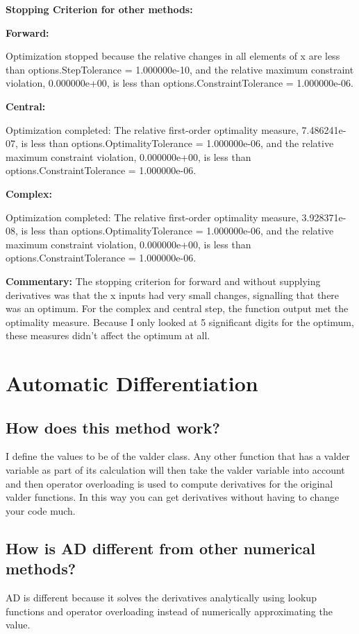 \documentclass[a4paper]{article}
\begin{document}
\textbf{Stopping Criterion for other methods:}

\textbf{Forward:}

Optimization stopped because the relative changes in all elements of x are
less than options.StepTolerance = 1.000000e-10, and the relative maximum constraint
violation, 0.000000e+00, is less than options.ConstraintTolerance = 1.000000e-06.

\textbf{Central:}

Optimization completed: The relative first-order optimality measure, 7.486241e-07,
is less than options.OptimalityTolerance = 1.000000e-06, and the relative maximum constraint
violation, 0.000000e+00, is less than options.ConstraintTolerance = 1.000000e-06.

\textbf{Complex:}

Optimization completed: The relative first-order optimality measure, 3.928371e-08,
is less than options.OptimalityTolerance = 1.000000e-06, and the relative maximum constraint
violation, 0.000000e+00, is less than options.ConstraintTolerance = 1.000000e-06.

\textbf{Commentary:}
The stopping criterion for forward and without supplying derivatives was that the x inputs had very small changes, signalling that there was an optimum. 
For the complex and central step, the function output met the optimality measure. 
Because I only looked at 5 significant digits for the optimum, these measures didn't affect the optimum at all.

\section{Automatic Differentiation}
\subsection{How does this method work?}
I define the values to be of the valder class. 
Any other function that has a valder variable as part of its calculation will then take the valder variable  into account and then operator overloading is used to compute derivatives for the original valder functions.
In this way you can get derivatives without having to change your code much.
\subsection{How is AD different from other numerical methods?}
AD is different because it solves the derivatives analytically using lookup functions and operator overloading instead of numerically approximating the value.
\end{document}
